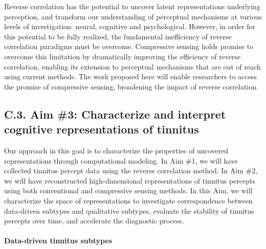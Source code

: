 \documentclass[11pt, notitlepage]{article} %
\begin{document}
Reverse correlation has the potential to uncover latent representations underlying perception, and
transform our understanding of perceptual mechanisms at various levels of investigation: neural, cognitive
and psychological. However, in order for this potential to be fully realized, the fundamental inefficiency of
reverse correlation paradigms must be overcome. Compressive sensing holds promise to overcome this
limitation by dramatically improving the efficiency of reverse correlation, enabling its extension to
perceptual mechanisms that are out of reach using current methods. The work proposed here will enable
researchers to access the promise of compressive sensing, broadening the impact of reverse correlation.

\subsection*{C.3. Aim \#3: Characterize and interpret cognitive representations of tinnitus}

Our approach in this goal is to characterize the properties of uncovered representations
through computational modeling.
In Aim \#1, we will have collected tinnitus percept data using the reverse correlation method.
In Aim \#2, we will have reconstructed high-dimensional representations of tinnitus percepts
using both conventional and compressive sensing methods.
In this Aim, we will characterize the space of representations
to investigate correspondence between data-driven subtypes and qualitative subtypes,
evaluate the stability of tinnitus percepts over time,
and accelerate the diagnostic process.

\paragraph{Data-driven tinnitus subtypes}
\end{document}
